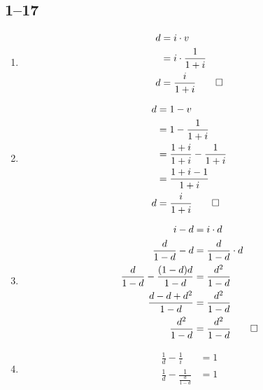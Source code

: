 \documentclass[a4paper, 12pt, reqno]{amsart}
\numberwithin{equation}{section}
\begin{document}
\subsection*{1--17}

\begin{enumerate}[label=(\alph*)]
    \item \begin{equation}\nonumber
            \begin{aligned}
                d &= i \cdot v              \\
                  &= i \cdot \frac{1}{1+i}  \\
                d &= \frac{i}{1+i} \qed
            \end{aligned}
        \end{equation}
    \item \begin{equation}\nonumber
            \begin{aligned}
                d &= 1 - v              \\
                  &= 1 - \frac{1}{1+i}  \\
                  &= \frac{1+i}{1+i} - \frac{1}{1+i}  \\
                  &= \frac{1+i-1}{1+i}  \\
                d &= \frac{i}{1+i} \qed
            \end{aligned}
        \end{equation}
    \item \begin{equation}\nonumber
            \begin{aligned}
                i-d &= i \cdot d              \\
                \frac{d}{1-d} - d &= \frac{d}{1-d} \cdot d  \\
                \frac{d}{1-d} - \frac{(1-d)d}{1-d} &= \frac{d^2}{1-d} \\
                \frac{d-d + d^2}{1-d} &= \frac{d^2}{1-d} \\
                \frac{d^2}{1-d} &= \frac{d^2}{1-d} \qed
            \end{aligned}
        \end{equation}
    \item \begin{equation}\nonumber
            \begin{aligned}
                \frac{1}{d} - \frac{1}{i} &= 1   \\
                \frac{1}{d} - \frac{1}{\frac{d}{1-d}} &= 1   \\

\end{aligned}
\end{equation}
\end{enumerate}
\end{document}
